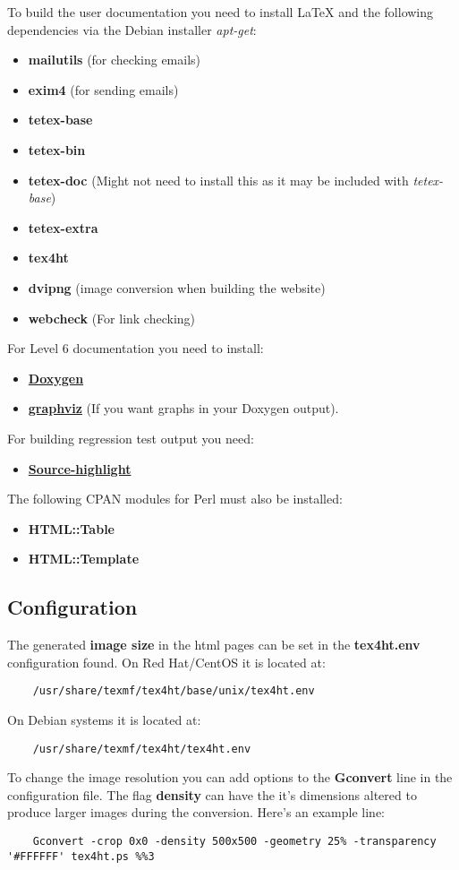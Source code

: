 \documentclass[12pt]{article}
\begin{document}
To build the user documentation you need to install \LaTeX\,\,and the following dependencies via the Debian installer {\it apt-get}:
\begin{itemize}
\item[]{\bf mailutils} (for checking emails)
\item[]{\bf exim4} (for sending emails)
\item[]{\bf tetex-base}
\item[]{\bf tetex-bin}
\item[]{\bf tetex-doc} (Might not need to install this as it may be included with {\it tetex-base})
\item[]{\bf tetex-extra}
\item[]{\bf tex4ht}
\item[]{\bf dvipng} (image conversion when building the website)
\item[]{\bf webcheck} (For link checking) 
\end{itemize}
For Level 6 documentation you need to install:
\begin{itemize}
   \item[]\href{http://www.doxygen.org/}{\bf Doxygen}
   \item[]\href{http://www.graphviz.org/Download.php}{\bf graphviz} (If you want graphs in your Doxygen output).
\end{itemize}
For building regression test output you need:
\begin{itemize}
   \item[]\href{http://www.gnu.org/software/src-highlite/}{\bf Source-highlight} 
\end{itemize}
The following CPAN modules for Perl must also be installed:
\begin{itemize}
   \item[]{\bf HTML::Table}
   \item[]{\bf HTML::Template}
\end{itemize}


\subsection*{Configuration}

The generated {\bf image size} in the html pages can be set in the {\bf tex4ht.env} configuration found. On Red Hat/CentOS it is located at:

\begin{verbatim}
	/usr/share/texmf/tex4ht/base/unix/tex4ht.env
\end{verbatim}

On Debian systems it is located at:

\begin{verbatim}
	/usr/share/texmf/tex4ht/tex4ht.env
\end{verbatim}

To change the image resolution you can add options to the {\bf Gconvert} line in the configuration file. The flag {\bf density} can have the it's dimensions altered to produce larger images during the conversion. Here's an example line:

\begin{verbatim}
	Gconvert -crop 0x0 -density 500x500 -geometry 25% -transparency  '#FFFFFF' tex4ht.ps %%3
\end{verbatim}
\end{document}
